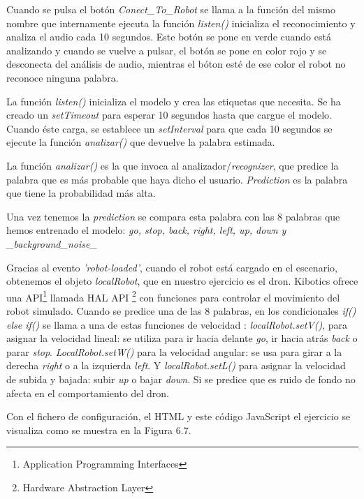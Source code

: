Cuando se pulsa el botón \textit{Conect\_To\_Robot} se llama a la función del mismo nombre que internamente ejecuta  la función \textit{listen()}  inicializa el reconocimiento y analiza el audio cada 10 segundos.
Este botón se pone en verde cuando está analizando y cuando se vuelve a pulsar, el botón se pone en color rojo y se desconecta del análisis de audio, mientras el bóton esté de ese color el robot no reconoce ninguna palabra.

La función \textit{listen()} inicializa el modelo y crea las etiquetas que necesita. Se ha creado un \textit{setTimeout} para esperar 10 segundos hasta que cargue el modelo. Cuando éste carga, se establece un \textit{setInterval} para que cada 10 segundos se ejecute la función \textit{analizar()} que devuelve la palabra estimada.

La función \textit{analizar()} es la que invoca al analizador/\textit{recognizer}, que predice la palabra que es más probable que haya dicho el usuario.  \textit{Prediction} es la palabra que tiene la probabilidad más alta.  

Una vez tenemos la \textit{prediction} se compara esta palabra con las 8 palabras que hemos entrenado el modelo: \textit{go, stop, back, right, left, up, down y \_background\_noise\_}

Gracias al evento \textit{'robot-loaded'}, cuando el robot está cargado en el escenario, obtenemos el objeto \textit{localRobot}, que en nuestro ejercicio es el dron. Kibotics ofrece una API\footnote{Application Programming Interfaces} llamada HAL API \footnote{Hardware Abstraction Layer} con funciones para controlar el movimiento del robot simulado. Cuando se predice una de las 8 palabras, en los condicionales \textit{if(){} else if() {}} se llama a una de estas funciones de velocidad : \textit{localRobot.setV()}, para asignar la velocidad lineal: se utiliza para ir hacia delante \textit{go}, ir hacia atrás \textit{back} o parar \textit{stop}.  \textit{LocalRobot.setW()} para la velocidad angular: se usa para girar a la derecha \textit{right} o a la izquierda \textit{left}. Y \textit{localRobot.setL()} para asignar la velocidad de subida y bajada: subir \textit{up} o bajar \textit{down}. Si se predice que es ruido de fondo no afecta en el comportamiento del dron.

Con el fichero de configuración, el HTML y este código JavaScript el ejercicio se visualiza como se muestra en la Figura 6.7.

